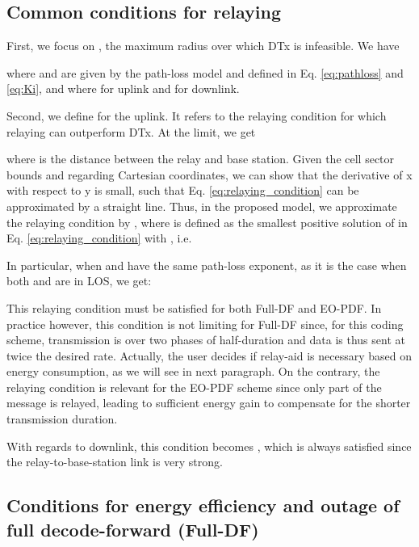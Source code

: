 \documentclass[journal]{IEEEtran}
\theoremstyle{definition}
\begin{document}
\subsection{Common conditions for relaying}

First, we focus on , the maximum radius over which DTx is infeasible. We have

where  and  are given by the path-loss model and defined in Eq. \eqref{eq:pathloss} and \eqref{eq:Ki}, and where  for uplink and  for downlink.

Second, we define  for the uplink. It refers to the relaying condition  for which relaying can outperform DTx. At the limit, we get

where  is the distance between the relay and base station.
Given the cell sector bounds and regarding Cartesian coordinates, we can show that the derivative of x with respect to y is small, such that Eq. \eqref{eq:relaying_condition} can be approximated by a straight line. Thus, in the proposed model, we approximate the relaying condition  by , where
 is defined as the smallest positive solution of  in Eq. \eqref{eq:relaying_condition} with , i.e.
\vspace*{-10pt}

In particular, when  and  have the same path-loss exponent, as it is the case when both  and  are in LOS, we get:
\vspace*{-10pt}

This relaying condition must be satisfied for both Full-DF and EO-PDF. In practice however, this condition is not limiting for Full-DF since, for this coding scheme, transmission is over two phases of half-duration and data is thus sent at twice the desired rate. Actually, the user decides if relay-aid is necessary based on energy consumption, as we will see in next paragraph. On the contrary, the relaying condition  is relevant for the EO-PDF scheme since only part of the message is relayed, leading to sufficient energy gain to compensate for the shorter transmission duration.

With regards to downlink, this condition becomes , which is always satisfied since the relay-to-base-station link is very strong.



\subsection{Conditions for energy efficiency and outage of full decode-forward (Full-DF)}
\end{document}
